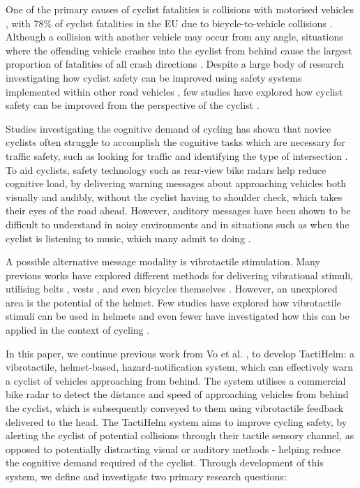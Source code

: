 \documentclass{mpaper}
\begin{document}
One of the primary causes of cyclist fatalities is collisions with motorised vehicles \cite{BIL20101632}, with 78\% of cyclist fatalities in the EU due to bicycle-to-vehicle collisions \cite{adminaite2015making}. Although a collision with another vehicle may occur from any angle, situations where the offending vehicle crashes into the cyclist from behind cause the largest proportion of fatalities of all crash directions \cite{BIL20101632}. Despite a large body of research investigating how cyclist safety can be improved using safety systems implemented within other road vehicles \cite{scholliers2014potential, SILLA2017134, cieslik2019improving, 7929602, 10.1145/3434770.3459732}, few studies have explored how cyclist safety can be improved from the perspective of the cyclist \cite{10.1145/3490099.3511127, STROHAEKER2022151}. 

Studies investigating the cognitive demand of cycling has shown that novice cyclists often struggle to accomplish the cognitive tasks which are necessary for traffic safety, such as looking for traffic and identifying the type of intersection \cite{https://doi.org/10.1002/acp.2350050205}. To aid cyclists, safety technology such as rear-view bike radars \cite{garminradar} help reduce cognitive load, by delivering warning messages about approaching vehicles both visually and audibly, without the cyclist having to shoulder check, which takes their eyes of the road ahead. However, auditory messages have been shown to be difficult to understand in noisy environments \cite{noisyenv} and in situations such as when the cyclist is listening to music, which many admit to doing \cite{DEWAARD2011626}.

A possible alternative message modality is vibrotactile stimulation. Many previous works have explored different methods for delivering vibrational stimuli, utilising belts \cite{10.1145/2449396.2449450, 10.1145/1060581.1060585}, vests \cite{10.1145/2556288.2557404}, and even bicycles themselves \cite{10.1145/2371574.2371631, 10.1145/3290605.3300850}. However, an unexplored area is the potential of the helmet. Few studies have explored how vibrotactile stimuli can be used in helmets \cite{10.1007/978-3-642-39802-5_3, yamauchi2020vibro} and even fewer have investigated how this can be applied in the context of cycling \cite{krauss2021head}.

In this paper, we continue previous work from Vo et al. \cite{10.1145/3411763.3451580}, to develop TactiHelm: a vibrotactile, helmet-based, hazard-notification system, which can effectively warn a cyclist of vehicles approaching from behind. The system utilises a commercial bike radar to detect the distance and speed of approaching vehicles from behind the cyclist, which is subsequently conveyed to them using vibrotactile feedback delivered to the head. The TactiHelm system aims to improve cycling safety, by alerting the cyclist of potential collisions through their tactile sensory channel, as opposed to potentially distracting visual or auditory methods - helping reduce the cognitive demand required of the cyclist. Through development of this system, we define and investigate two primary research questions:
\end{document}
